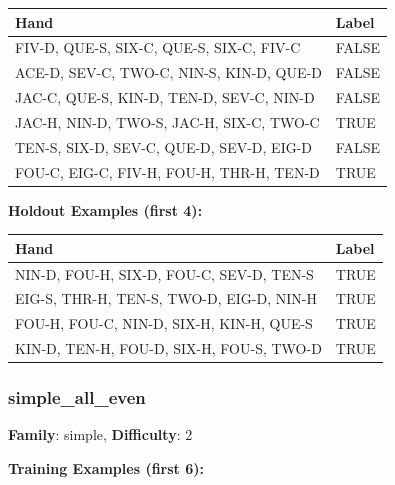 \documentclass[10pt,a4paper]{article}
\begin{document}
\begin{small}
\begin{tabular}{p{8cm}l}
\toprule
Hand & Label \\
\midrule
FIV-D, QUE-S, SIX-C, QUE-S, SIX-C, FIV-C & \textcolor{negative}{FALSE} \\
ACE-D, SEV-C, TWO-C, NIN-S, KIN-D, QUE-D & \textcolor{negative}{FALSE} \\
JAC-C, QUE-S, KIN-D, TEN-D, SEV-C, NIN-D & \textcolor{negative}{FALSE} \\
JAC-H, NIN-D, TWO-S, JAC-H, SIX-C, TWO-C & \textcolor{positive}{TRUE} \\
TEN-S, SIX-D, SEV-C, QUE-D, SEV-D, EIG-D & \textcolor{negative}{FALSE} \\
FOU-C, EIG-C, FIV-H, FOU-H, THR-H, TEN-D & \textcolor{positive}{TRUE} \\
\bottomrule
\end{tabular}
\end{small}

\textbf{Holdout Examples (first 4):}

\begin{small}
\begin{tabular}{p{8cm}l}
\toprule
Hand & Label \\
\midrule
NIN-D, FOU-H, SIX-D, FOU-C, SEV-D, TEN-S & \textcolor{positive}{TRUE} \\
EIG-S, THR-H, TEN-S, TWO-D, EIG-D, NIN-H & \textcolor{positive}{TRUE} \\
FOU-H, FOU-C, NIN-D, SIX-H, KIN-H, QUE-S & \textcolor{positive}{TRUE} \\
KIN-D, TEN-H, FOU-D, SIX-H, FOU-S, TWO-D & \textcolor{positive}{TRUE} \\
\bottomrule
\end{tabular}
\end{small}

\vspace{0.5cm}

\subsubsection{simple\_all\_even}

\textbf{Family}: simple, \textbf{Difficulty}: 2

\textbf{Training Examples (first 6):}
\end{document}
